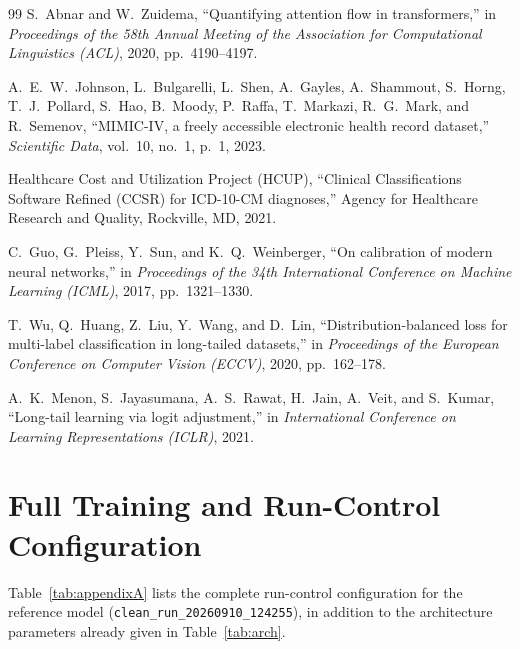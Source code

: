 \documentclass[11pt]{article}
\begin{document}
\begin{thebibliography}{99}
S.~Abnar and W.~Zuidema, ``Quantifying attention flow in transformers,'' in
\emph{Proceedings of the 58th Annual Meeting of the Association for
Computational Linguistics (ACL)}, 2020, pp.~4190--4197.

A.~E.~W.~Johnson, L.~Bulgarelli, L.~Shen, A.~Gayles, A.~Shammout, S.~Horng,
T.~J.~Pollard, S.~Hao, B.~Moody, P.~Raffa, T.~Markazi, R.~G.~Mark, and
R.~Semenov, ``MIMIC-IV, a freely accessible electronic health record
dataset,'' \emph{Scientific Data}, vol.~10, no.~1, p.~1, 2023.

Healthcare Cost and Utilization Project (HCUP), ``Clinical Classifications
Software Refined (CCSR) for ICD-10-CM diagnoses,'' Agency for Healthcare
Research and Quality, Rockville, MD, 2021.

C.~Guo, G.~Pleiss, Y.~Sun, and K.~Q.~Weinberger, ``On calibration of modern
neural networks,'' in \emph{Proceedings of the 34th International Conference
on Machine Learning (ICML)}, 2017, pp.~1321--1330.

T.~Wu, Q.~Huang, Z.~Liu, Y.~Wang, and D.~Lin, ``Distribution-balanced loss
for multi-label classification in long-tailed datasets,'' in \emph{Proceedings
of the European Conference on Computer Vision (ECCV)}, 2020, pp.~162--178.

A.~K.~Menon, S.~Jayasumana, A.~S.~Rawat, H.~Jain, A.~Veit, and S.~Kumar,
``Long-tail learning via logit adjustment,'' in \emph{International
Conference on Learning Representations (ICLR)}, 2021.

\end{thebibliography}

\appendix

\section{Full Training and Run-Control Configuration}

Table~\ref{tab:appendixA} lists the complete run-control configuration for
the reference model (\texttt{clean\_run\_20260910\_124255}), in addition to
the architecture parameters already given in Table~\ref{tab:arch}.
\end{document}
